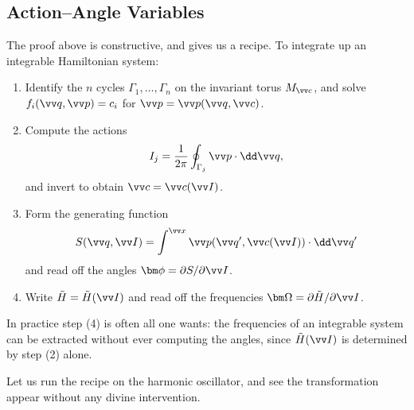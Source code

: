 \subsection{Action--Angle Variables}

The proof above is constructive, and gives us a recipe. To integrate up an integrable Hamiltonian system:
\begin{enumerate}[label=(\arabic*)]
	\item Identify the $n$ cycles $\Gamma_1,\dots,\Gamma_n$ on the invariant torus $M_{\vv c}$, and solve $f_i(\vv q, \vv p) = c_i$ for $\vv p = \vv p(\vv q, \vv c)$.
	\item Compute the actions
	$$
	I_j = \frac{1}{2\pi}\oint_{\Gamma_j}\vv p\cdot\dd\vv q,
	$$
	and invert to obtain $\vv c = \vv c(\vv I)$.
	\item Form the generating function
	$$
	S(\vv q, \vv I) = \int^{\vv x}\vv p(\vv q', \vv c(\vv I))\cdot\dd\vv q'
	$$
	and read off the angles $\bm\phi = \partial S/\partial \vv I$.
	\item Write $\tilde H = \tilde H(\vv I)$ and read off the frequencies $\bm\Omega = \partial\tilde H/\partial\vv I$.
\end{enumerate}
In practice step (4) is often all one wants: the frequencies of an integrable system can be extracted without ever computing the angles, since $\tilde H(\vv I)$ is determined by step (2) alone.

Let us run the recipe on the harmonic oscillator, and see the transformation appear without any divine intervention.

